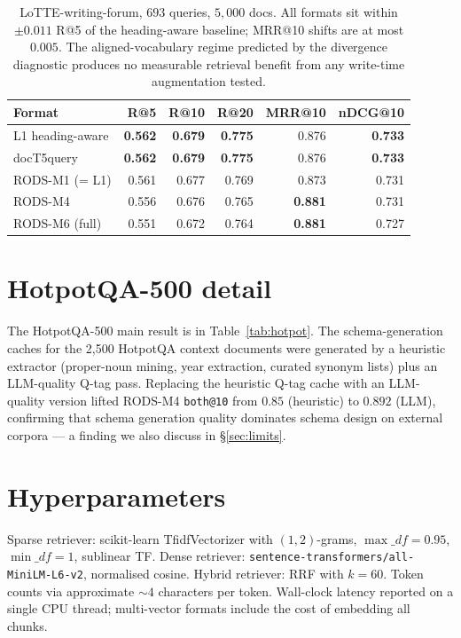 \documentclass[11pt]{article}
\begin{document}
\begin{table}[H]
\centering
\caption{LoTTE-writing-forum, $693$ queries, $5{,}000$ docs. All
  formats sit within $\pm 0.011$ R@5 of the heading-aware baseline;
  MRR@10 shifts are at most $0.005$. The aligned-vocabulary regime
  predicted by the divergence diagnostic produces no measurable
  retrieval benefit from any write-time augmentation tested.}
\label{tab:lotte}
\begin{tabular}{lrrrrr}
\toprule
\textbf{Format} & \textbf{R@5} & \textbf{R@10} & \textbf{R@20} & \textbf{MRR@10} & \textbf{nDCG@10} \\
\midrule
L1 heading-aware & \textbf{0.562} & \textbf{0.679} & \textbf{0.775} & 0.876 & \textbf{0.733} \\
docT5query       & \textbf{0.562} & \textbf{0.679} & \textbf{0.775} & 0.876 & \textbf{0.733} \\
RODS-M1 (= L1)   & 0.561 & 0.677 & 0.769 & 0.873 & 0.731 \\
RODS-M4          & 0.556 & 0.676 & 0.765 & \textbf{0.881} & 0.731 \\
RODS-M6 (full)   & 0.551 & 0.672 & 0.764 & \textbf{0.881} & 0.727 \\
\bottomrule
\end{tabular}
\end{table}

\section{HotpotQA-500 detail}
\label{app:hotpot}

The HotpotQA-500 main result is in Table~\ref{tab:hotpot}. The
schema-generation caches for the 2,500 HotpotQA context documents
were generated by a heuristic extractor (proper-noun mining, year
extraction, curated synonym lists) plus an LLM-quality Q-tag pass.
Replacing the heuristic Q-tag cache with an LLM-quality version
lifted RODS-M4 \texttt{both@10} from $0.85$ (heuristic) to $0.892$
(LLM), confirming that schema generation quality dominates schema
design on external corpora --- a finding we also discuss in
\S\ref{sec:limits}.

\section{Hyperparameters}

Sparse retriever: scikit-learn TfidfVectorizer with $(1,2)$-grams,
$\max\_df = 0.95$, $\min\_df = 1$, sublinear TF. Dense retriever:
\texttt{sentence-transformers/all-MiniLM-L6-v2}, normalised cosine.
Hybrid retriever: RRF with $k = 60$. Token counts via approximate
$\sim 4$ characters per token. Wall-clock latency reported on a
single CPU thread; multi-vector formats include the cost of embedding
all chunks.
\end{document}
